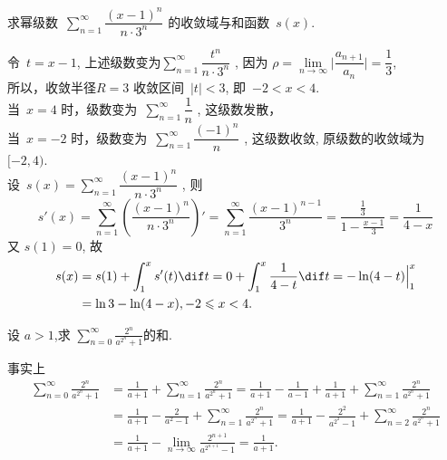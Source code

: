\documentclass[color=green,titlestyle=hang]{elegantbook}%
\begin{document}
\begin{exercise}
求幂级数~$\sum\limits_{n=1}^\infty\dfrac{(x-1)^n}{n\cdot3^n} $ 的收敛域与和函数~$s(x)$.
\end{exercise}\begin{Solution}
令~$t = x-1$, 上述级数变为$\sum\limits_{n=1}^\infty\dfrac{t^n}{n\cdot3^n} $ ,
因为 $\rho = \lim\limits_{n\rightarrow\infty}\Big| \dfrac{a_{n+1}}{a_{n}}\Big| = \dfrac{1}{3}$, \\
所以，收敛半径$R=3 $ 收敛区间~$|t|<3$, 即~$-2<x<4$. \\
当~$x = 4$ 时，级数变为~$\sum\limits_{n=1}^\infty\dfrac{1}{n}$ , 这级数发散，\\
当~$x = -2$ 时，级数变为~$\sum\limits_{n=1}^\infty\dfrac{(-1)^n}{n}$ , 这级数收敛, 原级数的收敛域为~$[-2,4)$.  \\
设~$s(x) = \sum\limits_{n=1}^\infty\dfrac{(x-1)^n}{n\cdot3^n}$ , 则
\[s'(x) = \sum\limits_{n=1}^\infty\left(\dfrac{(x-1)^n}{n\cdot3^n}\right)' = \sum\limits_{n=1}^\infty\dfrac{(x-1)^{n-1}}{3^n} = \dfrac{\frac{1}{3}}{1-\frac{x-1}{3}}=\dfrac{1}{4-x}\]
又 $s(1) = 0$, 故
\begin{align*}
s(x) &= s(1)+\int_1^x s'(t)\dif t = 0 + \int_1^x\dfrac{1}{4-t}\dif t=-\ln(4-t)\Big|_1^x \\
&= \ln3-\ln(4-x),-2\leqslant x<4.
\end{align*}
\end{Solution}

\begin{exercise}设 $a>1$,求 $\sum\limits_{n = 0}^\infty {\frac{{{2^n}}}{{{a^{{2^n}}} + 1}}}$的和.
\end{exercise}\begin{solution}
事实上
\begin{align*}\sum\limits_{n = 0}^\infty {\frac{{{2^n}}}{{{a^{{2^n}}} + 1}}} &= \frac{1}{{a + 1}} + \sum\limits_{n = 1}^\infty {\frac{{{2^n}}}{{{a^{{2^n}}} + 1}}} = \frac{1}{{a + 1}} - \frac{1}{{a - 1}} + \frac{1}{{a + 1}} + \sum\limits_{n = 1}^\infty {\frac{{{2^n}}}{{{a^{{2^n}}} + 1}}} \\&= \frac{1}{{a + 1}} - \frac{2}{{{a^2} - 1}} + \sum\limits_{n = 1}^\infty {\frac{{{2^n}}}{{{a^{{2^n}}} + 1}}} = \frac{1}{{a + 1}} - \frac{{{2^2}}}{{{a^{{2^2}}} - 1}} + \sum\limits_{n = 2}^\infty {\frac{{{2^n}}}{{{a^{{2^n}}} + 1}}} \\&= \frac{1}{{a + 1}} - \mathop {\lim }\limits_{n \to \infty } \frac{{{2^{n + 1}}}}{{{a^{{2^{n + 1}}}} - 1}} = \frac{1}{{a + 1}}.\end{align*}
\end{solution}
\end{document}
